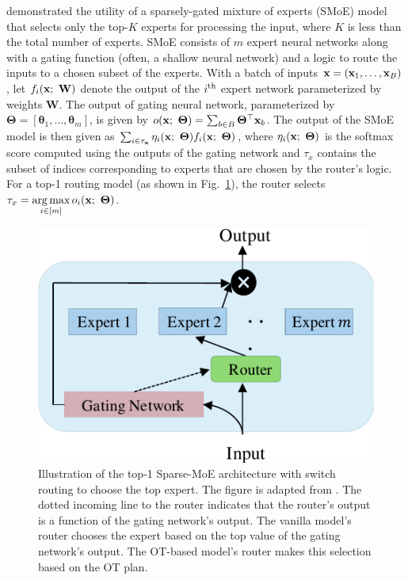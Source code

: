 \citet{shazeer2017} demonstrated the utility of a sparsely-gated mixture of experts (SMoE) model that selects only the top-$K$ experts for processing the input, where $K$ is less than the total number of experts.
SMoE consists of $m$ expert neural networks along with a gating function (often, a shallow neural network) and a logic to route the inputs to a chosen subset of the experts. With a batch of inputs $\mathbf{x}=(\mathbf{x}_1, \ldots, \mathbf{x}_B)$, let $f_i(\mathbf{x};\ \mathbf{W})$ denote the output of the $i^{\rm{th}}$ expert network parameterized by weights $\mathbf{W}$. The output of gating neural network, parameterized by $\bm{\Theta}= [\bm{\theta}_1, \ldots, \bm{\theta}_m]$, is given by $o(\mathbf{x};\ \bm{\Theta})=\sum_{b\in B}\bm{\Theta}^\top \mathbf{x}_b$. The output of the SMoE model is then given as $\sum_{i\in \tau_{\bx}}\eta_i(\bx; \ \bm{\Theta})f_i(\bx;\ \bm{\Theta})$, where $\eta_i(\mathbf{x};\ \bm{\Theta})$ is the softmax score computed using the outputs of the gating network
and $\tau_x$ contains the subset of indices corresponding to experts that are chosen by the router's logic. For a top-1 routing model (as shown in Fig.~\ref{fig:smoe}), the router selects $\tau_x=\argmax_{i\in [m]}o_i(\bx;\ \bm{\Theta})$.

\begin{figure}[t]
    \centering
    \includegraphics[scale=0.75]{chapter-2/images/SMoE.pdf}
    \caption[Illustration of the top-1 sparse-mixture-of-experts architecture used.]{Illustration of the top-1 Sparse-MoE architecture with switch routing to choose the top expert. The figure is adapted from \protect\cite{chen2022towards}. The dotted incoming line to the router indicates that the router's output is a function of the gating network's output. The vanilla model's router chooses the expert based on the top value of the gating network's output. The OT-based model's router makes this selection based on the OT plan.}\label{fig:smoe}
\end{figure}

